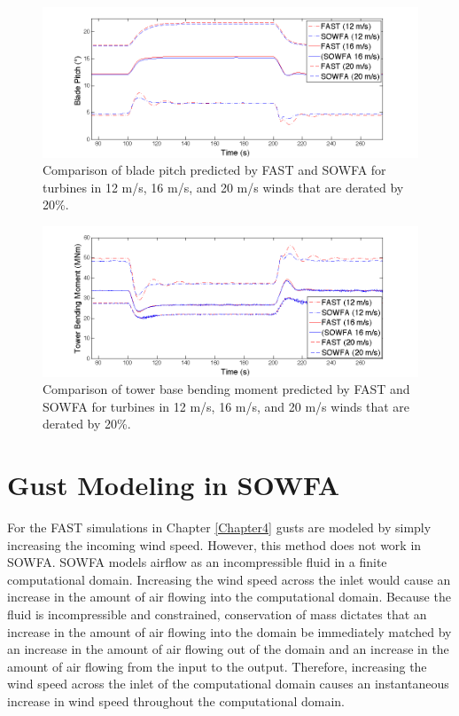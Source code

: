 \begin{figure}[ht]	
	\centering
		\includegraphics[width = .95\linewidth]{Figures/ch6Figures/fig6-4.png}

	\caption{Comparison of blade pitch predicted by FAST and SOWFA for turbines in 12 m/s, 16 m/s, and 20 m/s  winds that are derated by 20\%.}
	\label{fig6-4}
\end{figure}


\begin{figure}[htb]	
	\centering
		\includegraphics[width = .95\linewidth]{Figures/ch6Figures/fig6-6.png}

	\caption{Comparison of tower base bending moment predicted by FAST and SOWFA for turbines in 12 m/s, 16 m/s, and 20 m/s  winds that are derated by 20\%.}
	\label{fig6-6}
\end{figure}


\section{Gust Modeling in SOWFA} \label{section6-5}

For the FAST simulations in Chapter \ref{Chapter4} gusts are modeled by simply increasing the incoming wind speed. However, this method does not work in SOWFA. SOWFA models airflow as an incompressible fluid in a finite computational domain. Increasing the wind speed across the inlet would cause an increase in the amount of air flowing into the computational domain. Because the fluid is incompressible and constrained, conservation of mass dictates that an increase in the amount of air flowing into the domain be immediately matched by an increase in the amount of air flowing out of the domain and an increase in the amount of air flowing from the input to the output. Therefore, increasing the wind speed across the inlet of the computational domain causes an instantaneous increase in wind speed throughout the computational domain.

